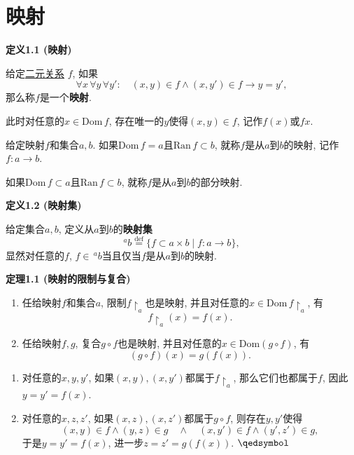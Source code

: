 \documentclass[UTF8]{ctexart}
\begin{document}
\setlength{\abovedisplayskip}{1pt}
\setlength{\belowdisplayskip}{1pt}

\section{映射}

\hypertarget{sec:定义1.1}{}
\noindent\textbf{定义1.1 (映射)}

给定\href{02 二元关系#nameddest=sec:定义1.1}{二元关系} $f$, 如果
\[
    \forall x\,\forall y\,\forall y':\quad(x,y)\in f\land(x,y')\in f\to y=y',
\]
那么称$f$是一个\textbf{映射}.

此时对任意的$x\in\mathrm{Dom}\,f$, 存在唯一的$y$使得$(x,y)\in f$, 记作$f(x)$或$fx$.

\vspace{10pt}

给定映射$f$和集合$a,b$.
如果$\mathrm{Dom}\,f=a$且$\mathrm{Ran}\,f\subset b$, 就称$f$是从$a$到$b$的映射,
记作$f:a\to b$.

如果$\mathrm{Dom}\,f\subset a$且$\mathrm{Ran}\,f\subset b$,
就称$f$是从$a$到$b$的部分映射.

\vspace{10pt}

\hypertarget{sec:定义1.2}{}
\noindent\textbf{定义1.2 (映射集)}

给定集合$a,b$, 定义从$a$到$b$的\textbf{映射集}
\[
    ^ab\overset{\mathrm{def}}{=}\{f\subset a\times b\mid f:a\to b\},
\]
显然对任意的$f$, $f\in\,\!^ab$当且仅当$f$是从$a$到$b$的映射.

\vspace{10pt}

\hypertarget{sec:定理1.1}{}
\noindent\textbf{定理1.1 (映射的限制与复合)}

\begin{enumerate}
    \item 任给映射$f$和集合$a$, 限制$f\!\restriction_a$也是映射,
    并且对任意的$x\in\mathrm{Dom}\,f\!\restriction_a$, 有
    \[
        f\!\restriction_a(x)=f(x).
    \]
    \item 任给映射$f,g$, 复合$g\circ f$也是映射,
    并且对任意的$x\in\mathrm{Dom}(g\circ f)$, 有
    \[
        (g\circ f)(x)=g(f(x)).
    \]
\end{enumerate}


\begin{enumerate}
    \item 对任意的$x,y,y'$, 如果$(x,y),(x,y')$都属于$f\!\restriction_a$,
    那么它们也都属于$f$, 因此$y=y'=f(x)$.
    \item 对任意的$x,z,z'$, 如果$(x,z),(x,z')$都属于$g\circ f$, 则存在$y,y'$使得
    \[
        (x,y)\in f\land(y,z)\in g\quad\land\quad
        (x,y')\in f\land(y',z')\in g,
    \]
    于是$y=y'=f(x)$, 进一步$z=z'=g(f(x))$. \hfill $\qedsymbol$
\end{enumerate}
\end{document}
